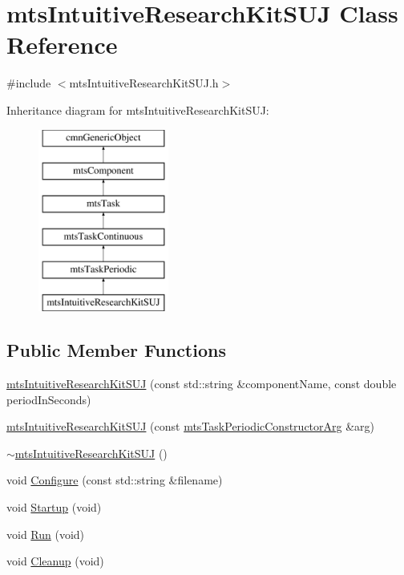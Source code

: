 \hypertarget{classmts_intuitive_research_kit_s_u_j}{\section{mts\-Intuitive\-Research\-Kit\-S\-U\-J Class Reference}
\label{classmts_intuitive_research_kit_s_u_j}
}


{\ttfamily \#include $<$mts\-Intuitive\-Research\-Kit\-S\-U\-J.\-h$>$}

Inheritance diagram for mts\-Intuitive\-Research\-Kit\-S\-U\-J\-:\begin{figure}[H]
\begin{center}
\leavevmode
\includegraphics[height=6.000000cm]{de/d34/classmts_intuitive_research_kit_s_u_j}
\end{center}
\end{figure}
\subsection*{Public Member Functions}
\begin{DoxyCompactItemize}
\item 
\hyperlink{classmts_intuitive_research_kit_s_u_j_a5442ef3e165ecac9e239aee22a9b9185}{mts\-Intuitive\-Research\-Kit\-S\-U\-J} (const std\-::string \&component\-Name, const double period\-In\-Seconds)
\item 
\hyperlink{classmts_intuitive_research_kit_s_u_j_a636c2447b4eea551bb75876ceb03268e}{mts\-Intuitive\-Research\-Kit\-S\-U\-J} (const \hyperlink{classmts_task_periodic_constructor_arg}{mts\-Task\-Periodic\-Constructor\-Arg} \&arg)
\item 
\hyperlink{classmts_intuitive_research_kit_s_u_j_a52f16dc86c6df164b1628c0069356547}{$\sim$mts\-Intuitive\-Research\-Kit\-S\-U\-J} ()
\item 
void \hyperlink{classmts_intuitive_research_kit_s_u_j_a1e9fc9ecd3b04bafb202a838c280eeb9}{Configure} (const std\-::string \&filename)
\item 
void \hyperlink{classmts_intuitive_research_kit_s_u_j_a106a3ace31c8620eba8af50ca812686f}{Startup} (void)
\item 
void \hyperlink{classmts_intuitive_research_kit_s_u_j_a5650f1c2bd2e4d9456c3ebc9e2e07b7b}{Run} (void)
\item 
void \hyperlink{classmts_intuitive_research_kit_s_u_j_a693df9978ababe2acfe8beda53626eb5}{Cleanup} (void)
\end{DoxyCompactItemize}
